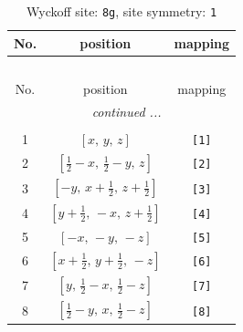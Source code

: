 \documentclass[fleqn,8pt]{jsarticle}
\begin{document}
\renewcommand{\arraystretch}{1.2}
\begin{longtable}{ccc}
\caption{Wyckoff site: {\tt 8g}, site symmetry: {\tt 1}}
 \\
 \hline \hline
No. & position & mapping \\ \hline \endfirsthead

\multicolumn{2}{l}{\tablename\ \thetable{}} \\
 \hline \hline
No. & position & mapping \\ \hline \endhead

 \hline \hline
\multicolumn{2}{r}{\footnotesize\it continued ...} \\ \endfoot

 \hline \hline
\multicolumn{2}{r}{} \\ \endlastfoot

1 & $\left[ x,\, y,\, z \right]$ & {\tt [1]} \\ \hline
2 & $\left[ \frac{1}{2} - x,\, \frac{1}{2} - y,\, z \right]$ & {\tt [2]} \\ \hline
3 & $\left[ - y,\, x + \frac{1}{2},\, z + \frac{1}{2} \right]$ & {\tt [3]} \\ \hline
4 & $\left[ y + \frac{1}{2},\, - x,\, z + \frac{1}{2} \right]$ & {\tt [4]} \\ \hline
5 & $\left[ - x,\, - y,\, - z \right]$ & {\tt [5]} \\ \hline
6 & $\left[ x + \frac{1}{2},\, y + \frac{1}{2},\, - z \right]$ & {\tt [6]} \\ \hline
7 & $\left[ y,\, \frac{1}{2} - x,\, \frac{1}{2} - z \right]$ & {\tt [7]} \\ \hline
8 & $\left[ \frac{1}{2} - y,\, x,\, \frac{1}{2} - z \right]$ & {\tt [8]} \\
\end{longtable}
\end{document}
